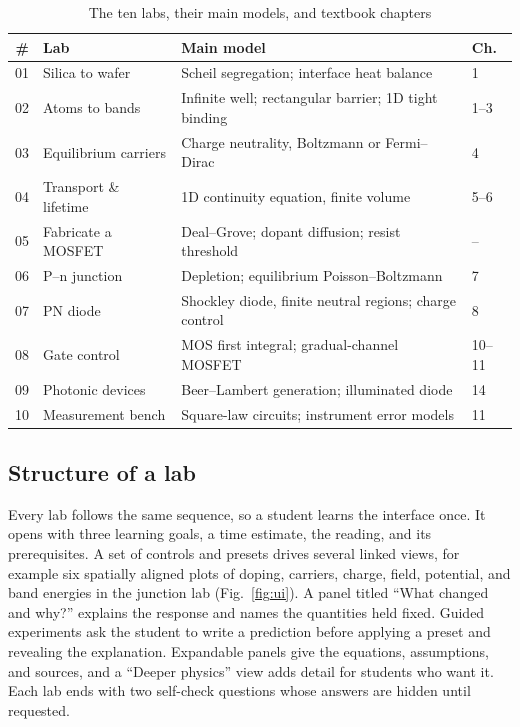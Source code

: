 \documentclass[conference]{IEEEtran}
\begin{document}
\begin{table}[t]
\centering
\caption{The ten labs, their main models, and textbook chapters \cite{neamen2012}}
\label{tab:modules}
\scriptsize
\setlength{\tabcolsep}{2.5pt}
\begin{tabular}{@{}r p{19mm} p{38mm} l@{}}
\toprule
\# & Lab & Main model & Ch. \\
\midrule
01 & Silica to wafer & Scheil segregation; interface heat balance & 1 \\
02 & Atoms to bands & Infinite well; rectangular barrier; 1D tight binding & 1--3 \\
03 & Equilibrium carriers & Charge neutrality, Boltzmann or Fermi--Dirac & 4 \\
04 & Transport \& lifetime & 1D continuity equation, finite volume & 5--6 \\
05 & Fabricate a MOSFET & Deal--Grove; dopant diffusion; resist threshold & -- \\
06 & P--n junction & Depletion; equilibrium Poisson--Boltzmann & 7 \\
07 & PN diode & Shockley diode, finite neutral regions; charge control & 8 \\
08 & Gate control & MOS first integral; gradual-channel MOSFET & 10--11 \\
09 & Photonic devices & Beer--Lambert generation; illuminated diode & 14 \\
10 & Measurement bench & Square-law circuits; instrument error models & 11 \\
\bottomrule
\end{tabular}
\end{table}

\subsection{Structure of a lab}
Every lab follows the same sequence, so a student learns the interface once. It opens with three learning goals, a time estimate, the reading, and its prerequisites. A set of controls and presets drives several linked views, for example six spatially aligned plots of doping, carriers, charge, field, potential, and band energies in the junction lab (Fig.~\ref{fig:ui}). A panel titled ``What changed and why?'' explains the response and names the quantities held fixed. Guided experiments ask the student to write a prediction before applying a preset and revealing the explanation. Expandable panels give the equations, assumptions, and sources, and a ``Deeper physics'' view adds detail for students who want it. Each lab ends with two self-check questions whose answers are hidden until requested.
\end{document}
